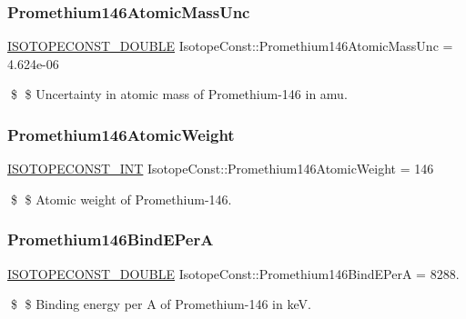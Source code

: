 \subsubsection{\texorpdfstring{Promethium146\+Atomic\+Mass\+Unc}{Promethium146AtomicMassUnc}}
{\footnotesize\ttfamily \mbox{\hyperlink{group___isotope_const-_macros_ga8f45a7272ce02c0b4c65c44636ed719a}{I\+S\+O\+T\+O\+P\+E\+C\+O\+N\+S\+T\+\_\+\+D\+O\+U\+B\+LE}} Isotope\+Const\+::\+Promethium146\+Atomic\+Mass\+Unc = 4.\+624e-\/06}

\$ \$ Uncertainty in atomic mass of Promethium-\/146 in amu. \mbox{\label{group___isotope_const-_promethium-_pm146_gab67f8aa59eb9ee3a5e224d91a58c5b6c}} 
\subsubsection{\texorpdfstring{Promethium146\+Atomic\+Weight}{Promethium146AtomicWeight}}
{\footnotesize\ttfamily \mbox{\hyperlink{group___isotope_const-_macros_ga5f18360b3e99483a35c32d789e62621c}{I\+S\+O\+T\+O\+P\+E\+C\+O\+N\+S\+T\+\_\+\+I\+NT}} Isotope\+Const\+::\+Promethium146\+Atomic\+Weight = 146}

\$ \$ Atomic weight of Promethium-\/146. \mbox{\label{group___isotope_const-_promethium-_pm146_ga08cfd20cfbd0a0502a2ba6d4208513e9}} 
\subsubsection{\texorpdfstring{Promethium146\+Bind\+E\+PerA}{Promethium146BindEPerA}}
{\footnotesize\ttfamily \mbox{\hyperlink{group___isotope_const-_macros_ga8f45a7272ce02c0b4c65c44636ed719a}{I\+S\+O\+T\+O\+P\+E\+C\+O\+N\+S\+T\+\_\+\+D\+O\+U\+B\+LE}} Isotope\+Const\+::\+Promethium146\+Bind\+E\+PerA = 8288.}

\$ \$ Binding energy per A of Promethium-\/146 in keV. \mbox{\label{group___isotope_const-_promethium-_pm146_ga66e4749070a2b4ec7d2f46fbc8608f0b}} 
